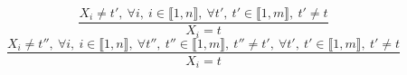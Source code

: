 $$\frac{X_{i} \neq t',~\forall i,~i \in \llbracket1,n\rrbracket,~\forall t',~t' \in \llbracket1,m\rrbracket,~t' \neq t}{X_{i}=t}$$ $$\frac{X_{i} \neq t'',~\forall i,~i \in \llbracket1,n\rrbracket,~\forall t'',~t'' \in \llbracket1,m\rrbracket,~t'' \neq t',~\forall t',~t' \in \llbracket1,m\rrbracket,~t' \neq t}{X_{i}=t}$$ 